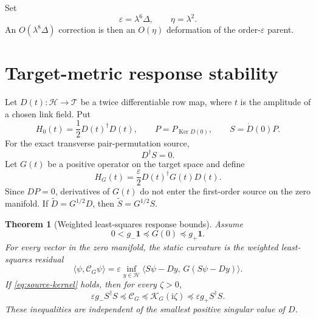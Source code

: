 \documentclass[11pt]{article}
\newtheorem{theorem}{Theorem}[section]
\theoremstyle{definition}
\theoremstyle{remark}
\newcommand{\cH}{\mathcal H}
\newcommand{\cT}{\mathcal T}
\newcommand{\cK}{\mathcal K}
\newcommand{\cC}{\mathcal C}
\newcommand{\Id}{\mathbf 1}
\newcommand{\Ker}{\operatorname{Ker}}
\newcommand{\I}{\mathrm i}
\newcommand{\eps}{\varepsilon}
\begin{document}
Set
\begin{equation}
 \eps=\lambda^6\Delta,
 \qquad
 \eta=\lambda^2.
 \label{eq:scales}
\end{equation}
An $O(\lambda^8\Delta)$ correction is then an $O(\eta)$ deformation of the
order-$\eps$ parent.

\section{Target-metric response stability}
\label{sec:metric}

Let $D(t):\cH\to\cT$ be a twice differentiable row map, where $t$ is the
amplitude of a chosen link field.  Put
\begin{equation}
 H_0(t)=\frac12D(t)^\dagger D(t),
 \qquad
 P=P_{\Ker D(0)},
 \qquad
 S=\dot D(0)P.
 \label{eq:parent-row}
\end{equation}
For the exact transverse pair-permutation source,
\begin{equation}
 D^\dagger S=0.
 \label{eq:source-kernel}
\end{equation}
Let $G(t)$ be a positive operator on the target space and define
\begin{equation}
 H_G(t)=\frac{\eps}{2}D(t)^\dagger G(t)D(t).
 \label{eq:metric-parent}
\end{equation}
Since $DP=0$, derivatives of $G(t)$ do not enter the first-order source on the
zero manifold.  If $\widetilde D=G^{1/2}D$, then
$\widetilde S=G^{1/2}S$.

\begin{theorem}[Weighted least-squares response bounds]
\label{thm:metric-bounds}
Assume
\begin{equation}
 0<g_-\Id\preceq G(0)\preceq g_+\Id.
 \label{eq:metric-bounds}
\end{equation}
For every vector in the zero manifold, the static curvature is the weighted
least-squares residual
\begin{equation}
 \langle\psi,\cC_G\psi\rangle
 =\eps\inf_{y\in\cH}
 \langle S\psi-Dy,\,G(S\psi-Dy)\rangle.
 \label{eq:weighted-ls}
\end{equation}
If \eqref{eq:source-kernel} holds, then for every $\zeta>0$,
\begin{equation}
 \boxed{
 \eps g_-S^\dagger S
 \preceq \cC_G
 \preceq \cK_G(\I\zeta)
 \preceq \eps g_+S^\dagger S.}
 \label{eq:metric-sandwich}
\end{equation}
These inequalities are independent of the smallest positive singular value of
$D$.
\end{theorem}
\end{document}
